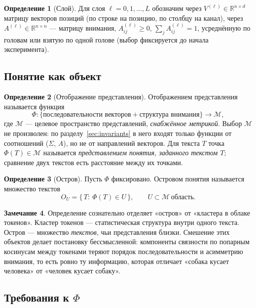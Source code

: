 \documentclass[11pt,a4paper]{article}
\theoremstyle{definition}
\newtheorem{definition}{Определение}[section]
\newtheorem{remark}[definition]{Замечание}
\theoremstyle{plain}
\newcommand{\R}{\mathbb{R}}
\begin{document}
\begin{definition}[Слой]
Для слоя $\ell=0,1,\dots,L$ обозначим через $V^{(\ell)}\in\R^{n\times d}$ матрицу векторов
позиций (по строке на позицию, по столбцу на канал), через $A^{(\ell)}\in\R^{n\times n}$ —
матрицу внимания, $A^{(\ell)}_{ij}\ge 0$, $\sum_j A^{(\ell)}_{ij}=1$, усреднённую по головам
или взятую по одной голове (выбор фиксируется до начала эксперимента).
\end{definition}

\subsection{Понятие как объект}

\begin{definition}[Отображение представления]
Отображением представления называется функция
\[
\Phi\colon \{\text{последовательности векторов}+\text{структура внимания}\}\longrightarrow \mathcal{M},
\]
где $\mathcal{M}$ — целевое пространство представлений, \emph{снабжённое метрикой}. Выбор
$\mathcal{M}$ не произволен: по разделу~\ref{sec:invariants} в него входят только функции от
соотношений ($\Sigma$, $A$), но не от направлений векторов. Для текста $T$ точка
$\Phi(T)\in\mathcal{M}$ называется \emph{представлением понятия, заданного текстом $T$};
сравнение двух текстов есть расстояние между их точками.
\end{definition}

\begin{definition}[Остров]
Пусть $\Phi$ фиксировано. Островом понятия называется множество текстов
\[
O_U=\{\,T:\ \Phi(T)\in U\,\},\qquad U\subset\mathcal{M}\ \text{область}.
\]
\end{definition}

\begin{remark}
Определение сознательно отделяет «остров» от «кластера в облаке токенов». Кластер токенов —
статистическая структура внутри одного текста. Остров — множество \emph{текстов}, чьи
представления близки. Смешение этих объектов делает постановку бессмысленной: компоненты
связности по попарным косинусам между токенами теряют порядок последовательности и
асимметрию внимания, то есть ровно ту информацию, которая отличает «собака кусает человека»
от «человек кусает собаку».
\end{remark}

\subsection{Требования к $\Phi$}
\end{document}
